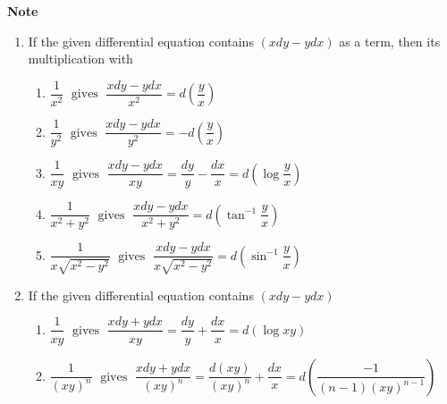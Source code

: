 \documentclass[a4paper, titlepage]{article}
\begin{document}
\textbf{Note}
\begin{enumerate}[label=\Roman*]
    \item If the given differential equation contains \( (xdy - ydx) \)
    as a term, then its multiplication with
    \begin{enumerate}[label=\roman*]
        \item $\dfrac{1}{x^2} \; \text{ gives } \; \dfrac{xdy - ydx}{x^2} = d\left( \dfrac{y}{x} \right)$
        \item $\dfrac{1}{y^2} \;\text{ gives } \; \dfrac{xdy - ydx}{y^2} = -d\left( \dfrac{y}{x} \right)$
        \item $\dfrac{1}{xy} \; \text{ gives } \; \dfrac{xdy - ydx}{xy} = \dfrac{dy}{y} - \dfrac{dx}{x} = d \left( \log \dfrac{y}{x} \right)$
        \item $\dfrac{1}{x^2 + y^2} \; \text{ gives } \; \dfrac{xdy - ydx}{x^2 + y^2} = d \left( \tan^{-1} \dfrac{y}{x} \right)$ 
        \item $\dfrac{1}{x\sqrt{x^2 - y^2}} \; \text{ gives } \; \dfrac{xdy - ydx}{x\sqrt{x^2 - y^2}} = d \left( \sin^{-1} \dfrac{y}{x} \right)$ 
    \end{enumerate}
    \item If the given differential equation contains \( (xdy - ydx) \)
    \begin{enumerate}[label=\roman*]
        \item $\dfrac{1}{xy} \; \text{ gives } \; \dfrac{xdy + ydx}{xy} = \dfrac{dy}{y} + \dfrac{dx}{x} = d \left( \log xy \right)$
        \item $\dfrac{1}{(xy)^n} \; \text{ gives } \; \dfrac{xdy + ydx}{(xy)^n} = \dfrac{d(xy)}{(xy)^n} + \dfrac{dx}{x} = d \left( \dfrac{-1}{(n-1)(xy)^{n-1}} \right)$
    \end{enumerate}
\end{enumerate}
\end{document}
